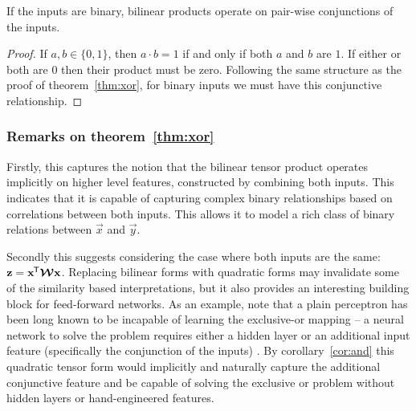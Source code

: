 {\begin{cor}\label{cor:and}
If the inputs are binary, bilinear products operate on pair-wise conjunctions of the inputs.
\end{cor}
\begin{proof}
If \(a, b \in \{0, 1\}\), then \(a \cdot b = 1\) if and only if both \(a\) and \(b\) are \(1\). If
either or both are \(0\) then their product must be zero. Following the same structure as the proof
of theorem~\ref{thm:xor}, for binary inputs we must have this conjunctive relationship.
\end{proof}

\subsubsection{Remarks on theorem~\ref{thm:xor}}
Firstly, this captures the notion that the bilinear tensor product operates implicitly on higher
level features, constructed by combining both inputs. This indicates that it is capable of capturing
complex binary relationships based on correlations between both inputs. This allows it
to model a rich class of binary relations between \(\vec{x}\) and \(\vec{y}\).

Secondly this suggests considering
the case where both inputs are the same: \(\mathbf{z} = \mathbf{x}^{\mkern-1.5mu\mathsf{T}}\bm{\mathcal{W}}\mathbf{x}\). Replacing
bilinear forms with quadratic forms may invalidate some of the similarity based interpretations,
but it also provides an interesting building block for feed-forward networks. As an example,
note that a plain perceptron has been long known to be incapable of learning the exclusive-or
mapping \autocite{Minsky1969} -- a neural network to solve the problem requires either a hidden layer
or an additional input feature (specifically the conjunction of the inputs) \autocite{Rumelhart1986}.
By corollary~\ref{cor:and} this quadratic tensor form would implicitly and naturally capture the
additional conjunctive feature and be capable of solving the exclusive or problem without hidden
layers or hand-engineered features.

}
